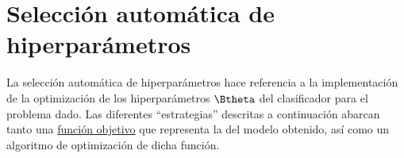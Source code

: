 \section{Selección automática de hiperparámetros}
La selección automática de hiperparámetros hace referencia a la
implementación de la optimización de los hiperparámetros $\Btheta$ del
clasificador para el problema dado.  Las diferentes ``estrategias''
descritas a continuación abarcan tanto una
\hyperref[funcobjetivo]{función objetivo} que representa la
 del modelo obtenido, así como un algoritmo de optimización
de dicha función.
